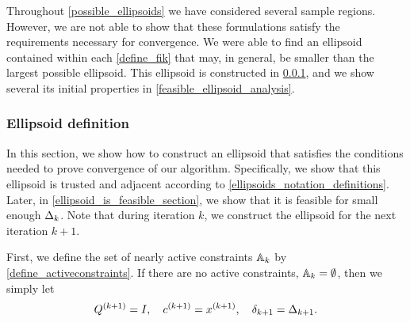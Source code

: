 Throughout \cref{possible_ellipsoids} we have considered several sample regions.
However, we are not able to show that these formulations satisfy the requirements necessary for convergence.  
We were able to find an ellipsoid contained within each \cref{define_fik} that may, in general, be smaller than the largest possible ellipsoid.
This ellipsoid is constructed in \cref{conservative_ellipsoid_construction}, and we show several its initial properties in \cref{feasible_ellipsoid_analysis}.


\subsubsection{Ellipsoid definition}
\label{conservative_ellipsoid_construction}

In this section,  we show how to construct an ellipsoid that satisfies the conditions needed to prove convergence of our algorithm.
Specifically, we show that this ellipsoid is
trusted and adjacent
according to \cref{ellipsoids_notation_definitions}.
Later, in \cref{ellipsoid_is_feasible_section}, we show that it is feasible for small enough $\Delta_k$.
Note that during iteration $k$, we construct the ellipsoid for the next iteration $k+1$.


First, we define the set of nearly active constraints ${\mathbb A_{k}}$ by \cref{define_activeconstraints}.
If there are no active constraints, ${\mathbb A_{k}} = \emptyset$, then we simply let
\begin{align}
{Q^{(k+1)}} = I, \quad {c^{(k+1)}} = {{x}^{(k+1)}}, \quad {\delta_{k+1}} = \Delta_{k+1}. \label{define_trivial_ellipsek}
\end{align}


